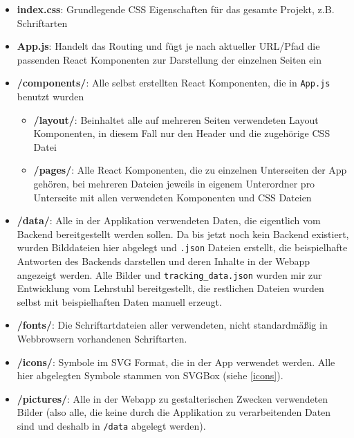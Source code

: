 \begin{itemize}
    \item \textbf{index.css}: Grundlegende CSS Eigenschaften für das gesamte Projekt, z.B. Schriftarten
    \item \textbf{App.js}: Handelt das Routing und fügt je nach aktueller URL/Pfad die passenden React Komponenten zur Darstellung der einzelnen Seiten ein
    \item \textbf{/components/}: Alle selbst erstellten React Komponenten, die in \texttt{App.js} benutzt wurden
    \begin{itemize}
        \item \textbf{/layout/}: Beinhaltet alle auf mehreren Seiten verwendeten Layout Komponenten, in diesem Fall nur den Header und die zugehörige CSS Datei
        \item \textbf{/pages/}: Alle React Komponenten, die zu einzelnen Unterseiten der App gehören, bei mehreren Dateien jeweils in eigenem Unterordner pro Unterseite mit allen verwendeten Komponenten und CSS Dateien
    \end{itemize}

    \item \textbf{/data/}: Alle in der Applikation verwendeten Daten, die eigentlich vom Backend bereitgestellt werden sollen. Da bis jetzt noch kein Backend existiert, wurden Bilddateien hier abgelegt und \texttt{.json} Dateien erstellt, die beispielhafte Antworten des Backends darstellen und deren Inhalte in der Webapp angezeigt werden. Alle Bilder und \texttt{tracking\_data.json} wurden mir zur Entwicklung vom Lehrstuhl bereitgestellt, die restlichen Dateien wurden selbst mit beispielhaften Daten manuell erzeugt.

    \item \textbf{/fonts/}: Die Schriftartdateien aller verwendeten, nicht standardmäßig in Webbrowsern vorhandenen Schriftarten.

    \item \textbf{/icons/}: Symbole im SVG Format, die in der App verwendet werden. Alle hier abgelegten Symbole stammen von SVGBox (siehe \ref{icons}).

    \item \textbf{/pictures/}: Alle in der Webapp zu gestalterischen Zwecken verwendeten Bilder (also alle, die keine durch die Applikation zu verarbeitenden Daten sind und deshalb in \texttt{/data} abgelegt werden).


\end{itemize}
